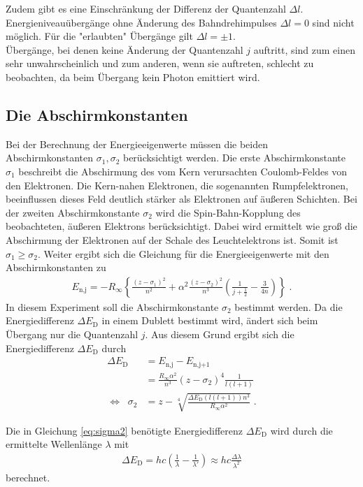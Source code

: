 Zudem gibt es eine Einschränkung der Differenz der Quantenzahl $\Delta l$. Energieniveauübergänge ohne Änderung des Bahndrehimpulses $\Delta l= 0$ sind nicht möglich. Für die "erlaubten" Übergänge gilt $\Delta l = \pm 1$.\\
Übergänge, bei denen keine Änderung der Quantenzahl $j$ auftritt, sind zum einen sehr unwahrscheinlich und zum anderen, wenn sie auftreten, schlecht zu beobachten, da beim Übergang kein Photon emittiert wird.

\subsection{Die Abschirmkonstanten}
Bei der Berechnung der Energieeigenwerte müssen die beiden Abschirmkonstanten $\sigma_1 , \sigma_2$ berücksichtigt werden. Die erste Abschirmkonstante $\sigma_1$ beschreibt die Abschirmung des vom Kern verursachten Coulomb-Feldes von den Elektronen. Die Kern-nahen Elektronen, die sogenannten Rumpfelektronen, beeinflussen dieses Feld deutlich stärker als Elektronen auf äußeren Schichten. Bei der zweiten Abschirmkonstante $\sigma_2$ wird die Spin-Bahn-Kopplung des beobachteten, äußeren Elektrons berücksichtigt. Dabei wird ermittelt wie groß die Abschirmung der Elektronen auf der Schale des Leuchtelektrons  ist. Somit ist $\sigma_1 \ge \sigma_2$.
Weiter ergibt sich die Gleichung für die Energieeigenwerte mit den Abschirmkonstanten zu
\begin{align}
  E_\textrm{n,j} = - R_\infty \left\{ \frac{(z-\sigma_1)^2}{n^2} + \alpha^2\frac{(z-\sigma_2)^2}{n^3} \left( \frac{1}{j+\frac{1}{2}} - \frac{3}{4n} \right) \right\}  \; .
  \label{eq:Energieeigenwerte_mit_Abschirmkonst.}
\end{align}
In diesem Experiment soll die Abschirmkonstante $\sigma_2$ bestimmt werden. Da die Energiedifferenz $\Delta E_\textrm{D}$ in einem Dublett bestimmt wird, ändert sich beim Übergang nur die Quantenzahl $j$. Aus diesem Grund ergibt sich die Energiedifferenz $\Delta E_\textrm{D}$ durch
\begin{align}
  \Delta E_\textrm{D} &= E_\textrm{n,j} - E_\textrm{n,j+1}\\
   &= \frac{R_\infty \alpha^2}{n^3}(z-\sigma_2)^4 \frac{1}{l(l+1)} \\
  \Leftrightarrow \; \; \sigma_2 &= z - \sqrt[4]{\frac{\Delta E_\textrm{D}(l(l+1))n^3}{R_\infty \alpha^2}} \;.
  \label{eq:sigma2}
\end{align}

Die in Gleichung \ref{eq:sigma2} benötigte Energiedifferenz $\Delta E_\textrm{D}$ wird durch die ermittelte Wellenlänge $\lambda$ mit
\begin{align}
  \Delta E_\textrm{D} = hc\left(\frac{1}{\lambda} - \frac{1}{\lambda'} \right) \approx h c\frac{\Delta\lambda}{\lambda^2}
  \label{eq:E_D}
\end{align}
berechnet.
